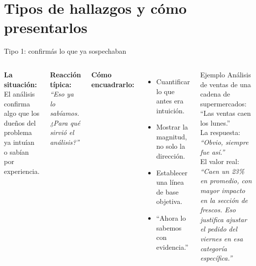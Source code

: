 \documentclass[aspectratio=169]{beamer}
\begin{document}
\section{Tipos de hallazgos y cómo presentarlos}

\begin{frame}{Tipo 1: confirmás lo que ya sospechaban}
  \begin{columns}
      \textbf{La situación:}\\
      El análisis confirma algo que los dueños del problema ya intuían o sabían por experiencia.

      \bigskip
      \textbf{Reacción típica:}\\
      \textit{``Eso ya lo sabíamos. ¿Para qué sirvió el análisis?''}

      \bigskip
      \textbf{Cómo encuadrarlo:}
      \begin{itemize}
        \item Cuantificar lo que antes era intuición.
        \item Mostrar la magnitud, no solo la dirección.
        \item Establecer una línea de base objetiva.
        \item ``Ahora lo sabemos con evidencia.''
      \end{itemize}
      \begin{exampleblock}{Ejemplo}
        Análisis de ventas de una cadena de supermercados: ``Las ventas caen los lunes.''\\
        \bigskip
        La respuesta: \textit{``Obvio, siempre fue así.''}\\
        \bigskip
        El valor real: \textit{``Caen un 23\% en promedio, con mayor impacto en la sección de frescos. Eso justifica ajustar el pedido del viernes en esa categoría específica.''}
      \end{exampleblock}
  \end{columns}
\end{frame}
\end{document}
